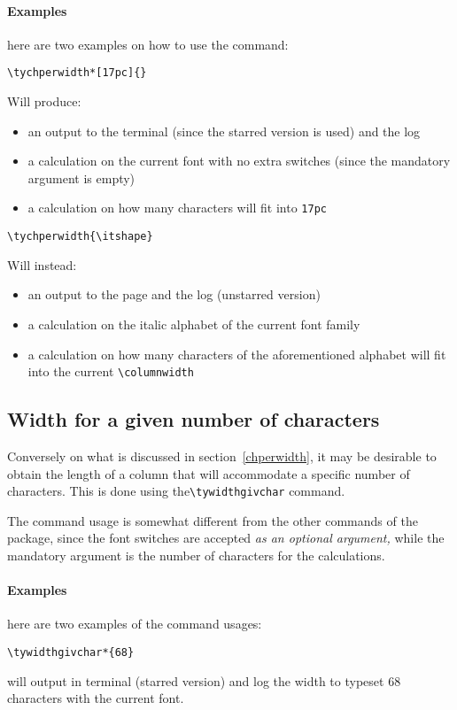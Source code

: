 \documentclass{article}
\makeatletter
\let\@@oldmpar\marginpar
\renewcommand{\marginpar}[1]{\@@oldmpar{\small#1}}
\makeatother
\begin{document}
\paragraph{Examples} here are two examples on how to use the command:
\begin{verbatim}
\tychperwidth*[17pc]{}
\end{verbatim}
Will produce:
\begin{itemize}
\item an output to the terminal (since the starred version is used) and the log
\item a calculation on the current font with no extra switches (since the mandatory argument is empty)
\item a calculation on how many characters will fit into \verb|17pc|
\end{itemize}

\begin{verbatim}
\tychperwidth{\itshape}
\end{verbatim}
Will instead:
\begin{itemize}
\item an output to the page and the log (unstarred version)
\item a calculation on the italic alphabet of the current font family
\item a calculation on how many characters of the aforementioned alphabet will fit into the current \verb|\columnwidth|
\end{itemize}

\subsection{Width for a given number of characters}\label{widthgivenchar}
Conversely on what is discussed in section~\vref{chperwidth}, it may be desirable to obtain the length of a column that will accommodate a specific number of characters. This is done using the\marginpar{\textbackslash tywidthgivchar}\verb|\tywidthgivchar| command.

The command usage is somewhat different from the other commands of the package, since the font switches are accepted \emph{as an optional argument,} while the mandatory argument is the number of characters for the calculations.
\paragraph{Examples} here are two examples of the command usages:
\begin{verbatim}
\tywidthgivchar*{68}
\end{verbatim}
will output in terminal (starred version) and log the width to typeset 68 characters with the current font.
\end{document}
